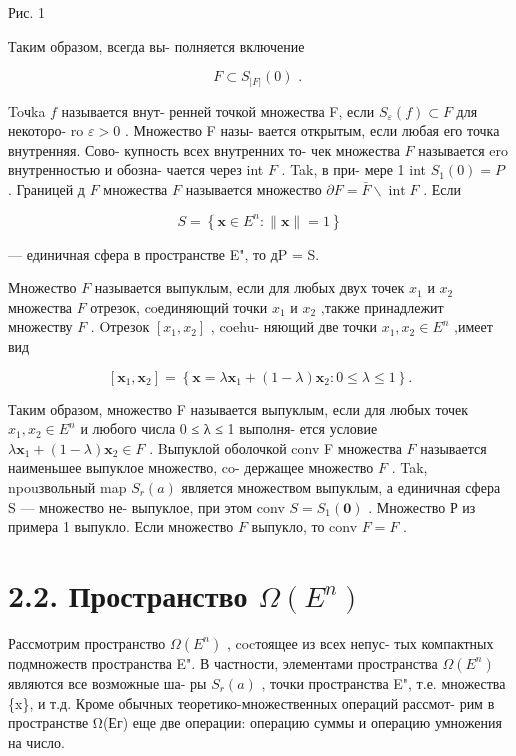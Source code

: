 \documentclass[8pt]{extarticle}
\begin{document}
Рис. 1

Таким образом, всегда вы- полняется включение

\[
F \subset  {S}_{\left| F\right| }\left( 0\right) \text{ . } \tag{2.3}
\]

Toчka \(f\) называется внут- ренней точкой множества F, если \({S}_{\varepsilon }\left( f\right)  \subset  F\) для некоторо- ro \(\varepsilon  > 0\) . Множество F назы- вается открытым, если любая его точка внутренняя. Сово- купность всех внутренних то- чек множества \(F\) называется ero внутренностью и обозна- чается через int \(F\) . Tak, в при- мере 1 int \({S}_{1}\left( 0\right)  = P\) . Границей д \(F\) множества \(F\) называется множество \(\partial F = \bar{F} \smallsetminus  \operatorname{int}F\) . Если

\[
S = \left\{  {\mathbf{x} \in  {E}^{n} : \parallel \mathbf{x}\parallel  = 1}\right\}
\]

— единичная сфера в пространстве E", то дP = S.

Множество \(F\) называется выпуклым, если для любых двух точек \({x}_{1}\) и \({x}_{2}\) множества \(F\) отрезок, coединяющий точки \({x}_{1}\) и \({x}_{2}\) ,также принадлежит множеству \(F\) . Oтрезок \(\left\lbrack  {{x}_{1},{x}_{2}}\right\rbrack\) , coehu- няющий две точки \({x}_{1},{x}_{2} \in  {E}^{n}\) ,имеет вид

\[
\left\lbrack  {{\mathbf{x}}_{1},{\mathbf{x}}_{2}}\right\rbrack   = \left\{  {\mathbf{x} = \lambda {\mathbf{x}}_{1} + \left( {1 - \lambda }\right) {\mathbf{x}}_{2} : 0 \leq  \lambda  \leq  1}\right\}  .
\]

Таким образом, множество F называется выпуклым, если для любых точек \({x}_{1},{x}_{2} \in  {E}^{n}\) и любого числа 0 ≤ λ ≤ 1 выполня- ется условие \(\lambda {\mathbf{x}}_{1} + \left( {1 - \lambda }\right) {\mathbf{x}}_{2} \in  F\) . Bыпуклой оболочкой conv F множества \(F\) называется наименьшее выпуклое множество, co- держащее множество \(F\) . Tak, npouзвольный map \({S}_{r}\left( a\right)\) является множеством выпуклым, а единичная сфера S — множество не- выпуклое, при этом conv \(S = {S}_{1}\left( \mathbf{0}\right)\) . Множество Р из примера 1 выпукло. Если множество \(F\) выпукло, то conv \(F = F\) .

\section*{2.2. Пространство \(\Omega \left( {E}^{n}\right)\)}

Рассмотрим пространство \(\Omega \left( {E}^{n}\right)\) , cocтоящее из всех непус- тых компактных подмножеств пространства E". В частности, элементами пространства \(\Omega \left( {E}^{n}\right)\) являются все возможные ша- ры \({S}_{r}\left( a\right)\) , точки пространства E", т.е. множества \{x\}, и т.д. Кроме обычных теоретико-множественных операций рассмот- рим в пространстве Ω(Ег) еще две операции: операцию суммы и операцию умножения на число.
\end{document}
